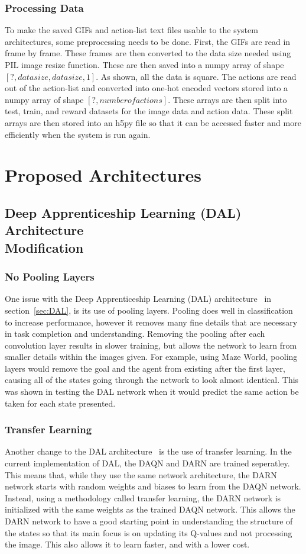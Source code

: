 \documentclass[12pt,american]{report}
\begin{document}
\subsection{Processing Data}
To make the saved GIFs and action-list text files usable to the system architectures, some preprocessing needs to be done.  First, the GIFs are read in frame by frame.  These frames are then converted to the data size needed using PIL image resize function.  These are then saved into a numpy array of shape $[?,data size, data size, 1]$.  As shown, all the data is square.  The actions are read out of the action-list and converted into one-hot encoded vectors stored into a numpy array of shape $[?,number of actions]$.  These arrays are then split into test, train, and reward datasets for the image data and action data.  These split arrays are then stored into an h5py file so that it can be accessed faster and more efficiently when the system is run again. 

\chapter{Proposed Architectures}
\label{sec:proposed_architectures}
\section{Deep Apprenticeship Learning (DAL) Architecture \\Modification}
\subsection{No Pooling Layers}
One issue with the Deep Apprenticeship Learning (DAL) architecture~\cite{markovikj2014deep} in section~\ref{sec:DAL}, is its use of pooling layers.  Pooling does well in classification to increase performance, however it removes many fine details that are necessary in task completion and understanding.  Removing the pooling after each convolution layer results in slower training, but allows the network to learn from smaller details within the images given.  For example, using Maze World, pooling layers would remove the goal and the agent from existing after the first layer, causing all of the states going through the network to look almost identical.  This was shown in testing the DAL network when it would predict the same action be taken for each state presented.
\subsection{Transfer Learning}
Another change to the DAL architecture~\cite{markovikj2014deep} is the use of transfer learning.  In the current implementation of DAL, the DAQN and DARN are trained seperatley.  This means that, while they use the same network architecture, the DARN network starts with random weights and biases to learn from the DAQN network.  Instead, using a methodology called transfer learning, the DARN network is initialized with the same weights as the trained DAQN network.  This allows the DARN network to have a good starting point in understanding the structure of the states so that its main focus is on updating its Q-values and not processing the image.  This also allows it to learn faster, and with a lower cost.
\end{document}

